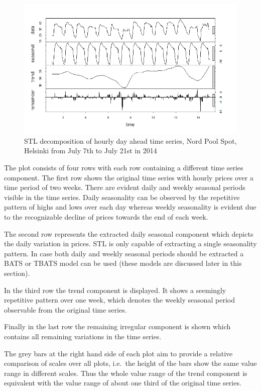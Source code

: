 \begin{figure}[htbp]
	\centering
		\includegraphics[width=1.00\textwidth]{figures/forecasting/stl_decomposition_July_2014.png}
	\caption{STL decomposition of hourly day ahead time series, Nord Pool Spot, Helsinki from July 7th to July 21st in 2014}	
	\label{fig:stl_decomposition_July_2014}
\end{figure}

The plot consists of four rows with each row containing a different time series component. 
The first row shows the original time series with hourly prices over a time period of two weeks. There are evident daily and weekly seasonal periods visible in the time series. Daily seasonality can be observed by the repetitive pattern of highs and lows over each day whereas weekly seasonality is evident due to the recognizable decline of prices towards the end of each week. 

The second row represents the extracted daily seasonal component which depicts the daily variation in prices. STL is only capable of extracting a single seasonality pattern. In case both daily and weekly seasonal periods should be extracted a BATS or TBATS model can be used (these models are discussed later in this section). 

In the third row the trend component is displayed. It shows a seemingly repetitive pattern over one week, which denotes the weekly seasonal period observable from the original time series. 

Finally in the last row the remaining irregular component is shown which contains all remaining variations in the time series. 

The grey bars at the right hand side of each plot aim to provide a relative comparison of scales over all plots, i.e.~the height of the bars show the same value range in different scales. Thus the whole value range of the trend component is equivalent with the value range of about one third of the original time series. 




